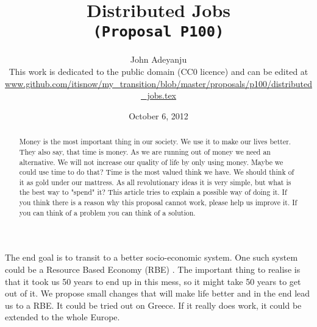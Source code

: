\documentclass{article}
\begin{document}
\title{Distributed Jobs\\\tt{\small{(Proposal P100)}}\\\tt{\small{}}}%
\author{John Adeyanju\\\small{This work is dedicated to the public domain (CC0 licence) and can be edited at}\\ \scriptsize{\url{www.github.com/itisnow/my_transition/blob/master/proposals/p100/distributed_jobs.tex}}}
\date{October 6, 2012}

\maketitle

\begin{abstract}
Money is the most important thing in our society.
We use it to make our lives better.
They also say, that time is money.
As we are running out of money we need an alternative.
We will not increase our quality of life by only using money.
Maybe we could use time to do that?
Time is the most valued think we have.
We should think of it as gold under our mattress.
As all revolutionary ideas it is very simple, but what is the best way to "spend" it? 
This article tries to explain a possible way of doing it.
If you think there is a reason why this proposal cannot work, please help us improve it.
If you can think of a problem you can think of a solution.
\end{abstract}

The end goal is to transit to a better socio-economic system.
One such system could be a Resource Based Economy (RBE) \cite{rbe}\cite{tzfs}.
The important thing to realise is that it took us 50 years to end up in this mess, so it might take 50 years to get out of it.
We propose small changes that will make life better and in the end lead us to a RBE.
It could be tried out on Greece.
If it really does work, it could be extended to the whole Europe.
\end{document}
